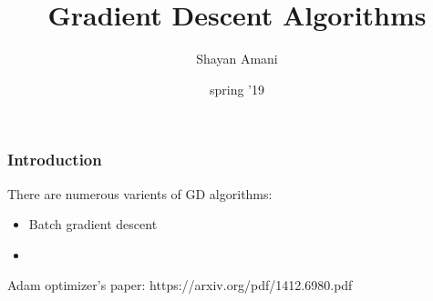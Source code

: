 \documentclass{beamer}
\title{Gradient Descent Algorithms}
\author{Shayan Amani}
\date{spring '19}
\institute{Department of Computer Science, University of New Hampshire}
\begin{document}
  \begin{frame}
    \titlepage
  \end{frame}

\begin{frame}
    \frametitle{Introduction}
    
    There are numerous varients of GD algorithms:
    \begin{itemize}
        \item Batch gradient descent
        \item
    \end{itemize}
    
   
    Adam optimizer's paper: https://arxiv.org/pdf/1412.6980.pdf

  \end{frame}
  
\end{document}
